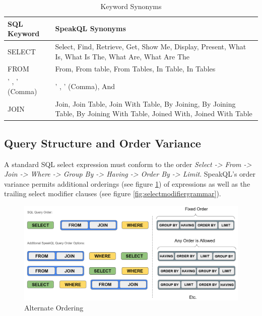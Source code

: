 \begin{center}
  \begin{table}
  \begin{tabular}{|m{6em} m{18em}|}
    \hline
    \textbf{SQL Keyword} & \textbf{SpeakQL Synonyms} \\
    \hline
    SELECT & Select, Find, Retrieve, Get, Show Me, Display, Present, What Is, What Is The, What Are, What Are The \\
    \hline
    FROM & From, From table, From Tables, In Table, In Tables \\
    \hline
    ' , ' (Comma) & ' , ' (Comma), And \\
    \hline
    JOIN & Join, Join Table, Join With Table, By Joining, By Joining Table, By Joining With Table, Joined With, Joined With Table \\
    \hline
  \end{tabular}
  \caption{Keyword Synonyms}
  \label{tab:keyword-synonyms}
\end{table}
\end{center}

\subsection{Query Structure and Order Variance}

A standard SQL select expression must conform to the order \emph{Select -> From -> Join -> Where -> Group By -> Having -> Order By -> Limit}. SpeakQL's order variance permits additional orderings (see figure \ref{fig:alternate_ordering}) of expressions as well as the trailing select modifier clauses (see figure \ref{fig:selectmodifiergrammar}).

\begin{figure}[H]
  \centering
  \includegraphics[width=\linewidth]{figures/alternate_ordering.png}
  \caption{Alternate Ordering}
  \label{fig:alternate_ordering}
\end{figure}

